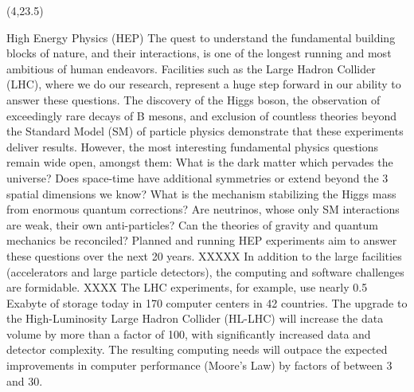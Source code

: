 \documentclass[final]{beamer}
\begin{document}
\begin{frame}{}
\begin{textblock}{38.0}(4,23.5)
\begin{block}{High Energy Physics (HEP)}
The quest to understand the fundamental building blocks of nature,
and their interactions, is one of the longest running and most
ambitious of human endeavors. Facilities such as the Large Hadron
Collider (LHC), where we do our research, represent a huge step
forward in our ability to answer these questions. The discovery of
the Higgs boson, the observation of exceedingly rare decays of B
mesons, and exclusion of countless theories beyond the Standard
Model (SM) of particle physics demonstrate that these experiments
deliver results. However, the most interesting fundamental physics
questions remain wide open, amongst them: What is the dark matter
which pervades the universe? Does space-time have additional
symmetries or extend beyond the 3 spatial dimensions we know? What
is the mechanism stabilizing the Higgs mass from enormous quantum
corrections? Are neutrinos, whose only SM interactions are weak,
their own anti-particles? Can the theories of gravity and quantum
mechanics be reconciled? Planned and running HEP experiments 
aim to answer these questions over the next 20 years. 
XXXXX In addition to the large facilities (accelerators and large particle
detectors), the computing and software challenges 
are formidable. XXXX
The LHC experiments, for example, use nearly 0.5 Exabyte of
storage today in 170 computer centers in 42 countries. 
The upgrade to the High-Luminosity Large Hadron Collider (HL-LHC) will
increase the data volume
by more than a factor of 100, with significantly increased data and detector complexity. The resulting computing needs will outpace the expected improvements in computer performance (Moore's Law) by factors of between 3 and 30. 


\end{block}
\end{textblock}
\end{frame}
\end{document}
